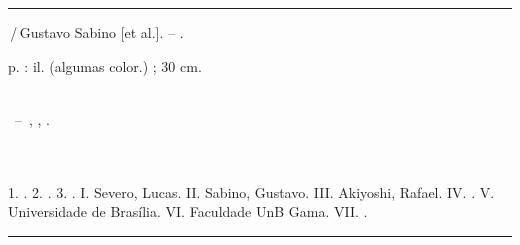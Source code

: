 \begin{fichacatalografica}
	\vspace*{\fill}					%
	\hrule							%
	\begin{center}					%
	\begin{minipage}[c]{12.5cm}		%

	\imprimirautorunico

	\hspace{0.5cm} \imprimirtitulo\,/\,Gustavo Sabino [et al.]. -- \imprimirdata.

	\hspace{0.5cm} \pageref{LastPage} p. : il. (algumas color.) ; 30 cm.\\

	\hspace{0.5cm} \imprimirorientadorRotulo~\imprimirorientador\\

	\hspace{0.5cm}
	\parbox[t]{\textwidth}{\imprimirtipotrabalho~--~\imprimirinstituicao, \imprimirlocal, \imprimirdata.}\\\\

	\hspace{0.5cm}
		1. \imprimirpalavrachaveum.
		2. \imprimirpalavrachavedois.
		3. \imprimirpalavrachavetres.
		I. Severo, Lucas.
		II. Sabino, Gustavo.
		III. Akiyoshi, Rafael.
		IV. \imprimirorientador.
		V. Universidade de Brasília.
		VI. Faculdade UnB Gama.
		VII. \imprimirtitulo.\\
	\end{minipage}
	\end{center}
	\hrule
\end{fichacatalografica}
\clearpage
